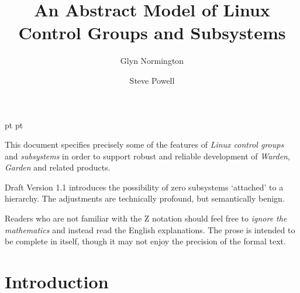 \documentclass[a4paper,twoside,12pt]{article}
\begin{document}
 pt
 pt

\def\Slash{\slash\hspace{0pt}}

\title{An Abstract Model of Linux Control Groups and Subsystems}

\author{
Glyn Normington\and
Steve Powell
}

\maketitle
\thispagestyle{empty}
\setcounter{page}{1}


This document specifies precisely some of the features of \emph{Linux control groups} and \emph{subsystems} 
in order to support robust and reliable development of \emph{Warden}, \emph{Garden} and related products.

Draft Version 1.1 introduces the possibility of zero subsystems `attached' to a hierarchy. The adjustments are
technically profound, but semantically benign.

Readers who are not familiar with the Z notation should feel free to \emph{ignore the mathematics} and instead
read the English explanations. 
The prose is intended to be complete in itself, though it may not enjoy the precision of the
formal text.


\newcommand{\true}{true}
\newcommand{\false}{false}
\renewcommand{\emptyset}{\varnothing}

\clearpage
\tableofcontents

\cleardoublepage
{}
\setcounter{page}{1}

\section{Introduction}
\end{document}
